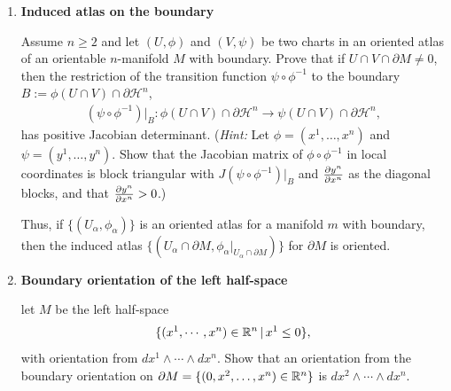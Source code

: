\documentclass[12pt,a4paper]{report}
\newcommand{\HHN}{\mathcal{H}^n}
\begin{document}
\begin{enumerate}[label=22.\arabic*]
Let $M$ be an oriented manifold with boundary, $\omega$ an orientation form for $M$, and $X$ a $C^\infty$ outward-pointing vector field along $\partial M$.
\begin{enumerate}
	\item if $\tau$ is another orientation form on $M$, then $\tau = f\omega$ for a $C^\infty$ everywhere-positive function $f$ on $M$.  Show that $\iota_X\tau = ft_X\omega$ and therefore, $\iota_X\tau \sim \iota_X\omega$ on $\partial M$.  (Here '$\sim$' is the equivalence relation defined in Subsection 21.4.)
	\item Prove that if $Y$ is another $C^\infty$ outward-pointing vector field along $\partial M$, then $\iota_X\omega \sim \iota_y\omega$ on $\partial M$.
\end{enumerate}

\item \textbf{Induced atlas on the boundary}

Assume $n \ge 2$ and let $(U,\phi)$ and $(V, \psi)$ be two charts in an oriented atlas of an orientable $n$-manifold $M$ with boundary.  Prove that if $U\cap V\cap \partial M\ne 0$, then the restriction of the transition function $\psi\circ\phi^{-1}$ to the boundary $B:= \phi(U\cap V)\cap\partial \HHN$,
\begin{align*}
	(\psi\circ\phi^{-1})|_B: \phi(U\cap V)\cap\partial\HHN\to\psi(U\cap V)\cap\partial\HHN,
\end{align*}has positive Jacobian determinant. (\textit{Hint:} Let $\phi=(x^1,\dots,x^n)$ and $\psi=(y^1,\dots,y^n)$.  Show that the Jacobian matrix of $\phi\circ\phi^{-1}$ in local coordinates is block triangular with $J(\psi\circ\phi^{-1})|_B$ and $\frac{\partial y^n}{\partial x^n}$ as the diagonal blocks, and that $\frac{\partial y^n}{\partial x^n} >0$.)

Thus, if $\{(U_\alpha,\phi_\alpha)\}$ is an oriented atlas for a manifold $m$ with boundary, then the induced atlas $\{(U_\alpha\cap\partial M, \phi_\alpha|_{U_\alpha\cap\partial M})\}$ for $\partial M$ is oriented.


\item \textbf{Boundary orientation of the left half-space}

let $M$ be the left half-space
\begin{align*}
	\{(x^1,\cdots, x^n)\in\mathbb{R}^n\,|\, x^1\le 0\},
\end{align*}with orientation from $dx^1\wedge\cdots\wedge dx^n$.  Show that an orientation from the boundary orientation on $\partial M = \{(0,x^2,\dots,x^n)\in \mathbb{R}^n\}$ is $dx^2\wedge\cdots\wedge dx^n$.


\end{enumerate}
\end{document}

